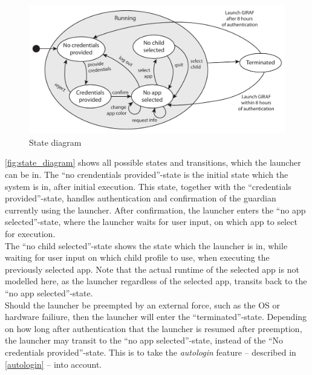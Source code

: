 \begin{figure}[h]
	\centering
	\includegraphics[width=1\textwidth]{gfx/statediagram.pdf}
	\caption{State diagram}
	\label{fig:state_diagram}
\end{figure}

\autoref{fig:state_diagram} shows all possible states and transitions, which the launcher can be in.
The ``no crendentials provided''-state is the initial state which the system is in, after initial execution.
This state, together with the ``credentials provided''-state, handles authentication and confirmation of the guardian currently using the launcher.
After confirmation, the launcher enters the ``no app selected''-state, where the launcher waits for user input, on which app to select for execution. \\

The ``no child selected''-state shows the state which the launcher is in, while waiting for user input on which child profile to use, when executing the previously selected app.
Note that the actual runtime of the selected app is not modelled here, as the launcher regardless of the selected app, transits back to the ``no app selected''-state. \\

Should the launcher be preempted by an external force, such as the OS or hardware failiure, then the launcher will enter the ``terminated''-state.
Depending on how long after authentication that the launcher is resumed after preemption, the launcher may transit to the ``no app selected''-state, instead of the ``No credentials provided''-state.
This is to take the \emph{autologin} feature -- described in \autoref{autologin} -- into account.
